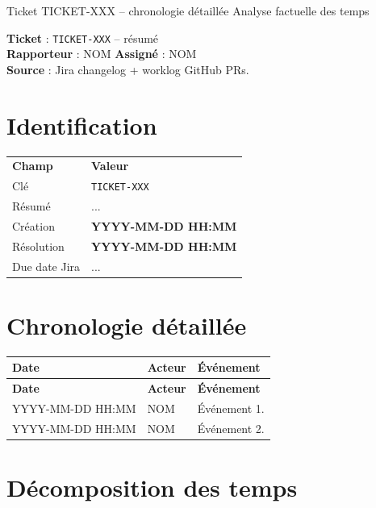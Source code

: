 \documentclass[11pt,a4paper]{article}
\begin{document}
\makeTealTitle
  {Ticket TICKET-XXX -- chronologie détaillée}
  {Analyse factuelle des temps}
  {\noindent\begin{infobox}
   \sffamily
   \textbf{Ticket} : \texttt{TICKET-XXX} -- \og résumé\fg{}\\[4pt]
   \textbf{Rapporteur} : NOM \quad\textbullet\quad \textbf{Assigné} : NOM\\[4pt]
   \textbf{Source} : Jira changelog + worklog \textbullet{} GitHub PRs.
  \end{infobox}}

\section*{Identification}

\begin{tabular}{ll}
\rowcolor{tealPrimary}\textbf{\color{white}Champ} & \textbf{\color{white}Valeur} \\
Clé              & \texttt{TICKET-XXX} \\
Résumé           & ... \\
Création         & \textbf{YYYY-MM-DD HH:MM} \\
Résolution       & \textbf{YYYY-MM-DD HH:MM} \\
Due date Jira    & ... \\
\end{tabular}

\section*{Chronologie détaillée}

\footnotesize
{}
\begin{longtable}{lp{3.5cm}p{8cm}}
\rowcolor{tealPrimary}\textbf{\color{white}Date} & \textbf{\color{white}Acteur} & \textbf{\color{white}Événement} \\
\endfirsthead
\rowcolor{tealPrimary}\textbf{\color{white}Date} & \textbf{\color{white}Acteur} & \textbf{\color{white}Événement} \\
\endhead
YYYY-MM-DD HH:MM & NOM    & Événement 1. \\
YYYY-MM-DD HH:MM & NOM    & Événement 2. \\
\end{longtable}
\normalsize

\section*{Décomposition des temps}
\end{document}
